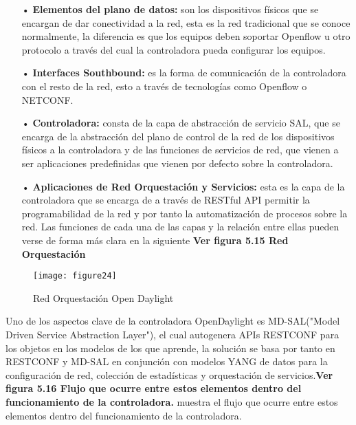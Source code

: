 \begin{itemize}
\item[•]\textbf{Elementos del plano de datos:} son los dispositivos físicos que se encargan de dar conectividad a la red, esta es la red tradicional que se conoce normalmente, la diferencia es que los equipos deben soportar Openflow u otro protocolo a través del cual la controladora pueda configurar los equipos.

\item[•]\textbf{Interfaces Southbound:} es la forma de comunicación de la controladora con el resto de la red, esto a través de tecnologías como Openflow o NETCONF.
\item[•]\textbf{Controladora:} consta de la capa de abstracción de servicio SAL, que se encarga
de la abstracción del plano de control de la red de los dispositivos físicos a la controladora y de las funciones de servicios de red, que vienen a ser aplicaciones predefinidas que vienen por defecto sobre la controladora.
\item[•]\textbf{Aplicaciones de Red Orquestación y Servicios:} esta es la capa de la controladora que se encarga de a través de RESTful API permitir la programabilidad de la red y por tanto la automatización de procesos sobre la red. Las funciones de cada una de las capas y la relación entre ellas pueden verse de forma más clara
en la siguiente \textbf{Ver figura 5.15 Red Orquestación}

\end{itemize}

\begin{figure}[htbp]
  \centering
    {\texttt{[image: figure24]}}%
  \caption{Red Orquestación Open Daylight}
  \label{fig:fig2subfig}
\end{figure}

Uno de los aspectos clave de la controladora OpenDaylight es MD-SAL("Model Driven Service Abstraction Layer"), el cual autogenera APIs RESTCONF para los objetos en
los modelos de los que aprende, la solución se basa por tanto en RESTCONF y MD-SAL en conjunción con modelos YANG de datos para la configuración de red, colección de estadísticas y orquestación de servicios.\textbf{Ver figura 5.16 Flujo que ocurre entre estos elementos dentro del funcionamiento de la controladora.} muestra el flujo que ocurre entre estos elementos dentro del funcionamiento de la controladora.

